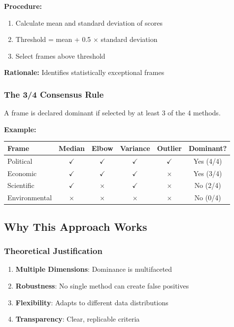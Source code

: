 \documentclass[11pt]{article}
\begin{document}
\begin{tcolorbox}[mybox={Method 4: Statistical Outliers}]
\textbf{Procedure:}
\begin{enumerate}
    \item Calculate mean and standard deviation of scores
    \item Threshold = mean + 0.5 × standard deviation
    \item Select frames above threshold
\end{enumerate}

\textbf{Rationale:} Identifies statistically exceptional frames
\end{tcolorbox}

\subsubsection{The 3/4 Consensus Rule}

A frame is declared dominant if selected by at least 3 of the 4 methods.

\textbf{Example:}
\begin{center}
\begin{tabular}{lccccc}
\toprule
\textbf{Frame} & \textbf{Median} & \textbf{Elbow} & \textbf{Variance} & \textbf{Outlier} & \textbf{Dominant?} \\
\midrule
Political & $\checkmark$ & $\checkmark$ & $\checkmark$ & $\checkmark$ & Yes (4/4) \\
Economic & $\checkmark$ & $\checkmark$ & $\checkmark$ & $\times$ & Yes (3/4) \\
Scientific & $\checkmark$ & $\times$ & $\checkmark$ & $\times$ & No (2/4) \\
Environmental & $\times$ & $\times$ & $\times$ & $\times$ & No (0/4) \\
\bottomrule
\end{tabular}
\end{center}

\subsection{Why This Approach Works}

\subsubsection{Theoretical Justification}

\begin{enumerate}
    \item \textbf{Multiple Dimensions}: Dominance is multifaceted
    \item \textbf{Robustness}: No single method can create false positives
    \item \textbf{Flexibility}: Adapts to different data distributions
    \item \textbf{Transparency}: Clear, replicable criteria
\end{enumerate}
\end{document}
